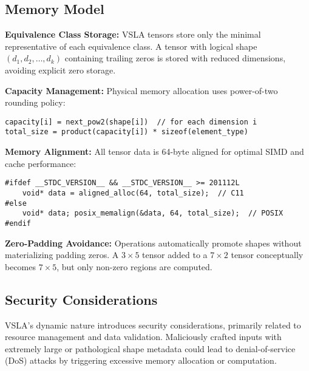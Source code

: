 \subsection{Memory Model}
\label{sec:memory}

\begin{tcolorbox}[colback=memory,colframe=red!50!black,title=Memory Layout and Optimization]
\textbf{Equivalence Class Storage:} VSLA tensors store only the minimal representative of each equivalence class. A tensor with logical shape $(d_1, d_2, \ldots, d_k)$ containing trailing zeros is stored with reduced dimensions, avoiding explicit zero storage.

\textbf{Capacity Management:} Physical memory allocation uses power-of-two rounding policy:
\begin{verbatim}
capacity[i] = next_pow2(shape[i])  // for each dimension i
total_size = product(capacity[i]) * sizeof(element_type)  
\end{verbatim}

\textbf{Memory Alignment:} All tensor data is 64-byte aligned for optimal SIMD and cache performance:
\begin{verbatim}
#ifdef __STDC_VERSION__ && __STDC_VERSION__ >= 201112L
    void* data = aligned_alloc(64, total_size);  // C11
#else
    void* data; posix_memalign(&data, 64, total_size);  // POSIX
#endif
\end{verbatim}

\textbf{Zero-Padding Avoidance:} Operations automatically promote shapes without materializing padding zeros. A $3 \times 5$ tensor added to a $7 \times 2$ tensor conceptually becomes $7 \times 5$, but only non-zero regions are computed.
\end{tcolorbox}

\subsection{Security Considerations}
VSLA's dynamic nature introduces security considerations, primarily related to resource management and data validation. Maliciously crafted inputs with extremely large or pathological shape metadata could lead to denial-of-service (DoS) attacks by triggering excessive memory allocation or computation.

